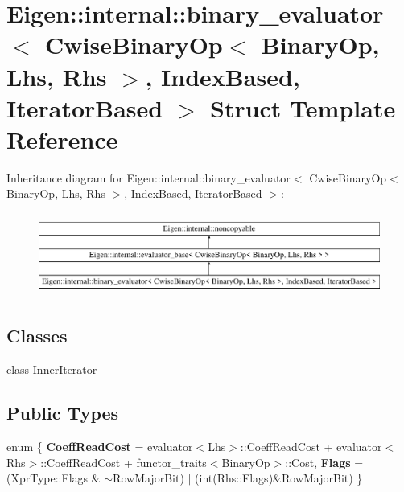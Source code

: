 \hypertarget{struct_eigen_1_1internal_1_1binary__evaluator_3_01_cwise_binary_op_3_01_binary_op_00_01_lhs_00_0e1df6e69b5cafbc50d80e8ad3bfd660e}{}\section{Eigen\+::internal\+::binary\+\_\+evaluator$<$ Cwise\+Binary\+Op$<$ Binary\+Op, Lhs, Rhs $>$, Index\+Based, Iterator\+Based $>$ Struct Template Reference}
\label{struct_eigen_1_1internal_1_1binary__evaluator_3_01_cwise_binary_op_3_01_binary_op_00_01_lhs_00_0e1df6e69b5cafbc50d80e8ad3bfd660e}
Inheritance diagram for Eigen\+::internal\+::binary\+\_\+evaluator$<$ Cwise\+Binary\+Op$<$ Binary\+Op, Lhs, Rhs $>$, Index\+Based, Iterator\+Based $>$\+:\begin{figure}[H]
\begin{center}
\leavevmode
\includegraphics[height=2.758621cm]{struct_eigen_1_1internal_1_1binary__evaluator_3_01_cwise_binary_op_3_01_binary_op_00_01_lhs_00_0e1df6e69b5cafbc50d80e8ad3bfd660e}
\end{center}
\end{figure}
\subsection*{Classes}
\begin{DoxyCompactItemize}
\item 
class \mbox{\hyperlink{class_eigen_1_1internal_1_1binary__evaluator_3_01_cwise_binary_op_3_01_binary_op_00_01_lhs_00_01e8cca8cc02c9e5385773e158b41ea484}{Inner\+Iterator}}
\end{DoxyCompactItemize}
\subsection*{Public Types}
\begin{DoxyCompactItemize}
\item 
\mbox{\label{struct_eigen_1_1internal_1_1binary__evaluator_3_01_cwise_binary_op_3_01_binary_op_00_01_lhs_00_0e1df6e69b5cafbc50d80e8ad3bfd660e_af1d10ffb352f10b4c27e98d4997c1a77}} 
enum \{ {\bfseries Coeff\+Read\+Cost} = evaluator$<$Lhs$>$\+::Coeff\+Read\+Cost + evaluator$<$Rhs$>$\+::Coeff\+Read\+Cost + functor\+\_\+traits$<$Binary\+Op$>$\+::Cost, 
{\bfseries Flags} = (Xpr\+Type\+::Flags \& $\sim$\+Row\+Major\+Bit) $\vert$ (int(Rhs\+::Flags)\&Row\+Major\+Bit)
 \}
\end{DoxyCompactItemize}

